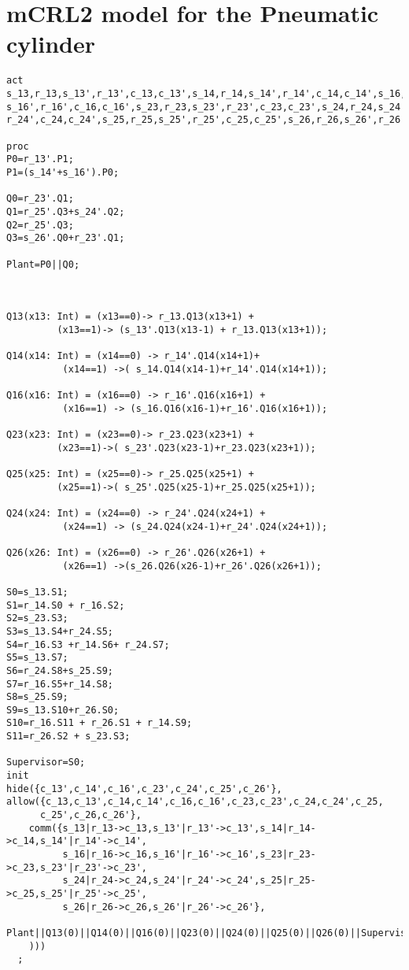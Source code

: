 \documentclass[a4paper,english,final]{article}
\theoremstyle{plain}
\theoremstyle{definition}
\begin{document}
\section{mCRL2 model for the Pneumatic cylinder}\label{appendix-pc}
\begin{verbatim}
act
s_13,r_13,s_13',r_13',c_13,c_13',s_14,r_14,s_14',r_14',c_14,c_14',s_16,r_16,
s_16',r_16',c_16,c_16',s_23,r_23,s_23',r_23',c_23,c_23',s_24,r_24,s_24',
r_24',c_24,c_24',s_25,r_25,s_25',r_25',c_25,c_25',s_26,r_26,s_26',r_26',c_26,c_26';

proc
P0=r_13'.P1;
P1=(s_14'+s_16').P0;

Q0=r_23'.Q1;
Q1=r_25'.Q3+s_24'.Q2;
Q2=r_25'.Q3;
Q3=s_26'.Q0+r_23'.Q1;

Plant=P0||Q0;



Q13(x13: Int) = (x13==0)-> r_13.Q13(x13+1) +
		 (x13==1)-> (s_13'.Q13(x13-1) + r_13.Q13(x13+1));

Q14(x14: Int) = (x14==0) -> r_14'.Q14(x14+1)+
		  (x14==1) ->( s_14.Q14(x14-1)+r_14'.Q14(x14+1));

Q16(x16: Int) = (x16==0) -> r_16'.Q16(x16+1) +
		  (x16==1) -> (s_16.Q16(x16-1)+r_16'.Q16(x16+1));

Q23(x23: Int) = (x23==0)-> r_23.Q23(x23+1) +
		 (x23==1)->( s_23'.Q23(x23-1)+r_23.Q23(x23+1));

Q25(x25: Int) = (x25==0)-> r_25.Q25(x25+1) +
		 (x25==1)->( s_25'.Q25(x25-1)+r_25.Q25(x25+1));

Q24(x24: Int) = (x24==0) -> r_24'.Q24(x24+1) +
		  (x24==1) -> (s_24.Q24(x24-1)+r_24'.Q24(x24+1));

Q26(x26: Int) = (x26==0) -> r_26'.Q26(x26+1) +
		  (x26==1) ->(s_26.Q26(x26-1)+r_26'.Q26(x26+1));

S0=s_13.S1;
S1=r_14.S0 + r_16.S2;
S2=s_23.S3;
S3=s_13.S4+r_24.S5;
S4=r_16.S3 +r_14.S6+ r_24.S7;
S5=s_13.S7;
S6=r_24.S8+s_25.S9;
S7=r_16.S5+r_14.S8;
S8=s_25.S9;
S9=s_13.S10+r_26.S0;
S10=r_16.S11 + r_26.S1 + r_14.S9;
S11=r_26.S2 + s_23.S3;

Supervisor=S0;
init
hide({c_13',c_14',c_16',c_23',c_24',c_25',c_26'},
allow({c_13,c_13',c_14,c_14',c_16,c_16',c_23,c_23',c_24,c_24',c_25,
      c_25',c_26,c_26'},
    comm({s_13|r_13->c_13,s_13'|r_13'->c_13',s_14|r_14->c_14,s_14'|r_14'->c_14',
          s_16|r_16->c_16,s_16'|r_16'->c_16',s_23|r_23->c_23,s_23'|r_23'->c_23',
          s_24|r_24->c_24,s_24'|r_24'->c_24',s_25|r_25->c_25,s_25'|r_25'->c_25',
          s_26|r_26->c_26,s_26'|r_26'->c_26'},
        Plant||Q13(0)||Q14(0)||Q16(0)||Q23(0)||Q24(0)||Q25(0)||Q26(0)||Supervisor
    )))
  ;
\end{verbatim}
\end{document}
